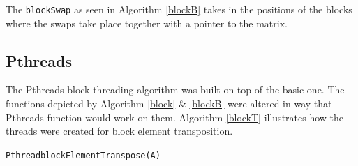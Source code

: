 \documentclass[conference]{IEEEtran}
\begin{document}
The \texttt{blockSwap} as seen in Algorithm \ref{blockB} takes in the positions of the blocks where the swaps take place together with a pointer to the matrix.

\subsection{Pthreads}
The Pthreads block threading algorithm was built on top of the basic one. The functions depicted by Algorithm \ref{block} \& \ref{blockB} were altered in way that Pthreads function would work on them. Algorithm \ref{blockT} illustrates how the threads were created for block element transposition. 


\begin{algorithm}[h!]


\caption{\texttt{PthreadblockElementTranspose(A)}}


\label{blockT}
\end{algorithm}
\end{document}
